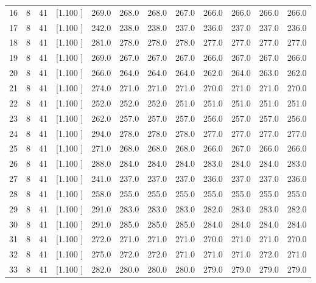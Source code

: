 \documentclass[12pt,a4paper]{article}
\begin{document}
\begin{center}
{\begin{tabular}{r r r r r r r r r r r r}
  16&  8& 41&[1.100     ]&   269.0&   268.0&   268.0&   267.0&   266.0&   266.0&   266.0&   266.0\\[-0.02in]
  17&  8& 41&[1.100     ]&   242.0&   238.0&   238.0&   237.0&   236.0&   237.0&   237.0&   236.0\\[-0.02in]
  18&  8& 41&[1.100     ]&   281.0&   278.0&   278.0&   278.0&   277.0&   277.0&   277.0&   277.0\\[-0.02in]
  19&  8& 41&[1.100     ]&   269.0&   267.0&   267.0&   267.0&   266.0&   267.0&   267.0&   266.0\\[-0.02in]
  20&  8& 41&[1.100     ]&   266.0&   264.0&   264.0&   264.0&   262.0&   264.0&   263.0&   262.0\\[-0.02in]
  21&  8& 41&[1.100     ]&   274.0&   271.0&   271.0&   271.0&   270.0&   271.0&   271.0&   270.0\\[-0.02in]
  22&  8& 41&[1.100     ]&   252.0&   252.0&   252.0&   251.0&   251.0&   251.0&   251.0&   251.0\\[-0.02in]
  23&  8& 41&[1.100     ]&   262.0&   257.0&   257.0&   257.0&   256.0&   257.0&   257.0&   256.0\\[-0.02in]
  24&  8& 41&[1.100     ]&   294.0&   278.0&   278.0&   278.0&   277.0&   277.0&   277.0&   277.0\\[-0.02in]
  25&  8& 41&[1.100     ]&   271.0&   268.0&   268.0&   268.0&   266.0&   267.0&   266.0&   266.0\\[-0.02in]
  26&  8& 41&[1.100     ]&   288.0&   284.0&   284.0&   284.0&   283.0&   284.0&   284.0&   283.0\\[-0.02in]
  27&  8& 41&[1.100     ]&   241.0&   237.0&   237.0&   237.0&   236.0&   237.0&   237.0&   236.0\\[-0.02in]
  28&  8& 41&[1.100     ]&   258.0&   255.0&   255.0&   255.0&   255.0&   255.0&   255.0&   255.0\\[-0.02in]
  29&  8& 41&[1.100     ]&   291.0&   283.0&   283.0&   283.0&   282.0&   283.0&   283.0&   282.0\\[-0.02in]
  30&  8& 41&[1.100     ]&   291.0&   285.0&   285.0&   285.0&   284.0&   284.0&   284.0&   284.0\\[-0.02in]
  31&  8& 41&[1.100     ]&   272.0&   271.0&   271.0&   271.0&   270.0&   271.0&   271.0&   270.0\\[-0.02in]
  32&  8& 41&[1.100     ]&   275.0&   272.0&   272.0&   271.0&   271.0&   271.0&   272.0&   271.0\\[-0.02in]
  33&  8& 41&[1.100     ]&   282.0&   280.0&   280.0&   280.0&   279.0&   279.0&   279.0&   279.0\\[-0.02in]

\end{tabular}}
\end{center}
\end{document}
